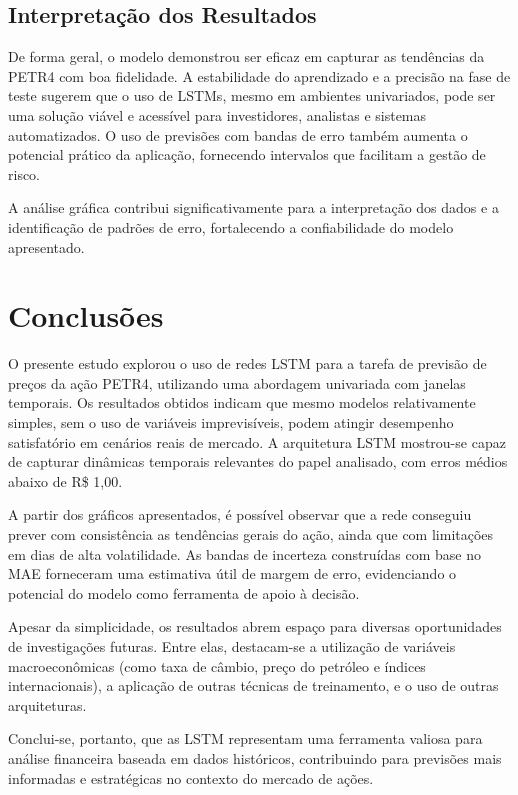 \documentclass[conference]{IEEEtran}
\begin{document}
\subsection{Interpretação dos Resultados}
De forma geral, o modelo demonstrou ser eficaz em capturar as tendências da PETR4 com boa fidelidade. A estabilidade do aprendizado e a precisão na fase de teste sugerem que o uso de LSTMs, mesmo em ambientes univariados, pode ser uma solução viável e acessível para investidores, analistas e sistemas automatizados. O uso de previsões com bandas de erro também aumenta o potencial prático da aplicação, fornecendo intervalos que facilitam a gestão de risco.

A análise gráfica contribui significativamente para a interpretação dos dados e a identificação de padrões de erro, fortalecendo a confiabilidade do modelo apresentado.

\section{Conclusões}
O presente estudo explorou o uso de redes LSTM para a tarefa de previsão de preços da ação PETR4, utilizando uma abordagem univariada com janelas temporais. Os resultados obtidos indicam que mesmo modelos relativamente simples, sem o uso de variáveis imprevisíveis, podem atingir desempenho satisfatório em cenários reais de mercado. A arquitetura LSTM mostrou-se capaz de capturar dinâmicas temporais relevantes do papel analisado, com erros médios abaixo de R\$ 1,00.

A partir dos gráficos apresentados, é possível observar que a rede conseguiu prever com consistência as tendências gerais do ação, ainda que com limitações em dias de alta volatilidade. As bandas de incerteza construídas com base no MAE forneceram uma estimativa útil de margem de erro, evidenciando o potencial do modelo como ferramenta de apoio à decisão.

Apesar da simplicidade, os resultados abrem espaço para diversas oportunidades de investigações futuras. Entre elas, destacam-se a utilização de variáveis macroeconômicas (como taxa de câmbio, preço do petróleo e índices internacionais), a aplicação de outras técnicas de treinamento, e o uso de outras arquiteturas.

Conclui-se, portanto, que as LSTM representam uma ferramenta valiosa para análise financeira baseada em dados históricos, contribuindo para previsões mais informadas e estratégicas no contexto do mercado de ações.
\end{document}
